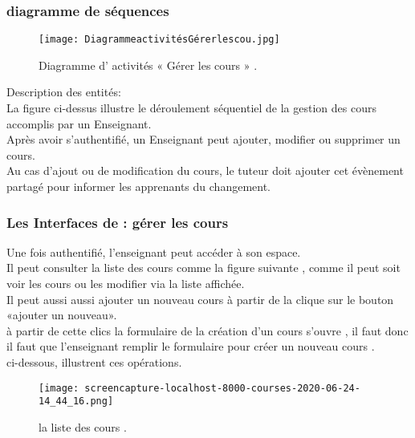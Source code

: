 \clearpage

\subsubsection{diagramme de séquences }
\begin{figure}[ht]
	\centering
	\texttt{[image: DiagrammeactivitésGérerlescou.jpg]}
	\caption{Diagramme d' activités « Gérer les cours » .}
	\label{fig:Diagramme d' activités  Gérer les cours  }
\end{figure}
\FloatBarrier

{\Large \color{cyan} Description des entités:}\\
La figure ci-dessus illustre le déroulement séquentiel de la gestion des cours accomplis par un Enseignant.\\
Après avoir s’authentifié, un Enseignant peut ajouter, modifier ou supprimer un cours.\\
Au cas d’ajout ou de modification du cours, le tuteur doit ajouter cet évènement  partagé pour informer les apprenants du changement.
\clearpage

\subsubsection{Les Interfaces de : gérer les cours  }
Une fois authentifié,  l'enseignant peut accéder à son espace. \\
Il peut consulter la liste  des cours comme la figure suivante
, comme il peut soit voir les cours ou les modifier
via la liste affichée. \\
Il peut aussi aussi ajouter un nouveau cours à partir de  la clique sur le bouton «ajouter un nouveau». \\
à partir de cette clics la formulaire de la création d'un cours s'ouvre , il faut donc il faut que l'enseignant remplir le formulaire  pour créer un nouveau cours .\\
ci-dessous, illustrent ces opérations.
\medskip
\medskip
\medskip
\begin{figure}[ht]
	\centering
	\texttt{[image: screencapture-localhost-8000-courses-2020-06-24-14\_44\_16.png]}
	\caption{la liste des cours .}
	\label{fig:la liste des cours  }
\end{figure}
\FloatBarrier

